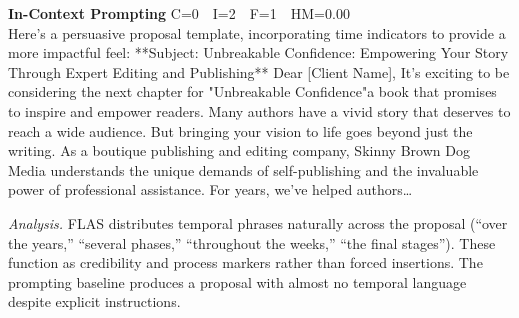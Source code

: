 \documentclass{article}
\begin{document}
\begin{casebox}
\begin{promptbox}
\textbf{In-Context Prompting} \hfill C=0~~I=2~~F=1~~HM=0.00\\[2pt]
Here's a persuasive proposal template, incorporating time indicators to provide a more impactful feel: **Subject: Unbreakable Confidence: Empowering Your Story Through Expert Editing and Publishing** Dear [Client Name], It's exciting to be considering the next chapter for "Unbreakable Confidence"a book that promises to inspire and empower readers. Many authors have a vivid story that deserves to reach a wide audience. But bringing your vision to life goes beyond just the writing. As a boutique publishing and editing company, Skinny Brown Dog Media understands the unique demands of self-publishing and the invaluable power of professional assistance. For years, we've helped authors\ldots
\end{promptbox}

\smallskip\noindent\textit{Analysis.}
FLAS distributes temporal phrases naturally across the proposal (``over the years,'' ``several phases,'' ``throughout the weeks,'' ``the final stages''). These function as credibility and process markers rather than forced insertions. The prompting baseline produces a proposal with almost no temporal language despite explicit instructions.
\end{casebox}
\end{document}
